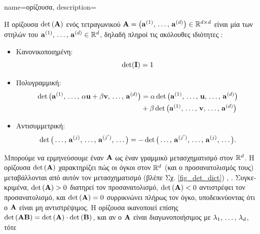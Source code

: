 {name={\foreignlanguage{greek}{ορίζουσα}},
	description={\foreignlanguage{greek}{Η ορίζουσα} $\det\,({\bf A})$ \foreignlanguage{greek}{ενός τετραγωνικού}
		 $\mA =\linebreak \big( \va^{(1)},\,\ldots,\,\va^{(\nrfeatures)} \big) \in \mathbb{R}^{\nrfeatures \times \nrfeatures}$ 
		\foreignlanguage{greek}{είναι μία}  \foreignlanguage{greek}{των στηλών του\linebreak 
		${\bf a}^{(1)},\,\ldots,\,{\bf a}^{(d)} \in \mathbb{R}^{d}$, δηλαδή πληροί τις ακόλουθες ιδιότητες} \cite{DirschmidHansJorg1996TuF}:
		\begin{itemize}
			\item \foreignlanguage{greek}{Κανονικοποιημένη}: $$\det (\mathbf{I}) = 1$$ 
			\item \foreignlanguage{greek}{Πολυγραμμική}: \begin{align} \nonumber \det \big({\bf a}^{(1)},\,\ldots,\,\alpha{\bf u}+ \beta {\bf v},\,\ldots,\,{\bf a}^{(d)} \big) & = \alpha\det \big({\bf a}^{(1)},\,\ldots,\,{\bf u},\,\ldots,\,{\bf a}^{(d)} \big) \\ 
			& +\beta\det \big({\bf a}^{(1)},\,\ldots,\,{\bf v},\,\ldots,\,{\bf a}^{(d)} \big) \nonumber
			\end{align}
			\item \foreignlanguage{greek}{Αντισυμμετρική}: $$\det \big(\ldots,\,{\bf a}^{(j)}, \,\ldots, \,{\bf a}^{(j')},\,\ldots \big) = - \det \big(\ldots,\,{\bf a}^{(j')}, \,\ldots, \,{\bf a}^{(j)},\,\ldots \big).$$ 
		\end{itemize}  
		\foreignlanguage{greek}{Μπορούμε να ερμηνεύσουμε έναν}  ${\bf A}$ \foreignlanguage{greek}{ως έναν γραμμικό
		μετασχηματισμό στον $\mathbb{R}^{d}$. Η ορίζουσα $\det\,({\bf A})$ χαρακτηρίζει πώς οι όγκοι στον $\mathbb{R}^d$ 
		(και ο προσανατολισμός τους) μεταβάλλονται από αυτόν τον μετασχηματισμό (βλέπε Σχ.} \ref{fig_det_dict}) \cite{GolubVanLoanBook}, \cite{Strang2007}. 
 		\foreignlanguage{greek}{Συγκεκριμένα, $\det\,({\bf A}) > 0$ διατηρεί τον προσανατολισμό, $\det\,({\bf A}) < 0$ αντιστρέφει τον προσανατολισμό, 
 		και $\det\,({\bf A}) = 0$ συρρικνώνει πλήρως τον όγκο, υποδεικνύοντας ότι ο ${\bf A}$ είναι μη αντιστρέψιμος. 
 		Η ορίζουσα ικανοποιεί επίσης $\det\,({\bf A} {\bf B}) = \det\,({\bf A}) \cdot \det\,({\bf B})$, και αν ο ${\bf A}$ είναι διαγωνοποιήσιμος με}
 		 $\lambda_{1}, \,\ldots, \,\lambda_{d}$, \foreignlanguage{greek}{τότε} 
}}
